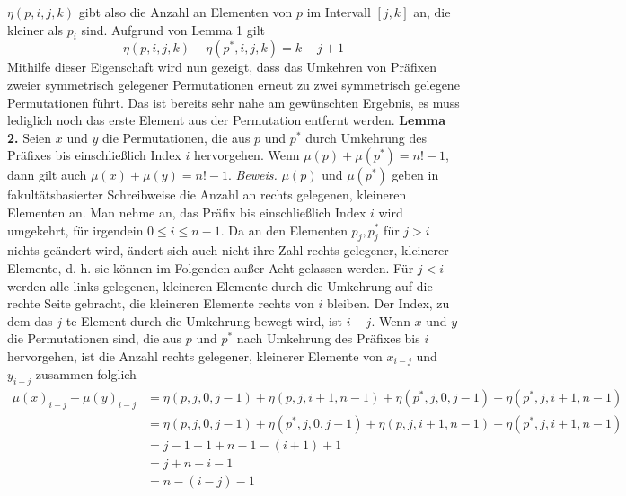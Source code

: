 \documentclass[a4paper, 11pt, ngerman]{article}
\begin{document}
$\eta(p, i, j, k)$ gibt also die Anzahl an Elementen von $p$ im Intervall $[j, k]$ an, die kleiner als $p_i$ sind. Aufgrund von Lemma 1 gilt
$$
    \eta(p, i, j, k) + \eta(p^*, i, j, k) = k - j + 1
$$
Mithilfe dieser Eigenschaft wird nun gezeigt, dass das Umkehren von Präfixen zweier symmetrisch gelegener Permutationen erneut zu zwei symmetrisch gelegene Permutationen führt. Das ist bereits sehr nahe am gewünschten Ergebnis, es muss lediglich noch das erste Element aus der Permutation entfernt werden.
\newline \newline
\textbf{Lemma 2.} Seien $x$ und $y$ die Permutationen, die aus $p$ und $p^*$ durch Umkehrung des Präfixes bis einschließlich Index $i$ hervorgehen. Wenn $\mu(p) + \mu(p^*) = n! - 1$, dann gilt auch $\mu(x) + \mu(y) = n! - 1$.
\newline \newline
\emph{Beweis.} $\mu(p)$ und $\mu(p^*)$ geben in fakultätsbasierter Schreibweise die Anzahl an rechts gelegenen, kleineren Elementen an. Man nehme an, das Präfix bis einschließlich Index $i$ wird umgekehrt, für irgendein $0 \le i \le n-1$. Da an den Elementen $p_j, p^*_j$ für $j > i$ nichts geändert wird, ändert sich auch nicht ihre Zahl rechts gelegener, kleinerer Elemente, d. h. sie können im Folgenden außer Acht gelassen werden. Für $j < i$ werden alle links gelegenen, kleineren Elemente durch die Umkehrung auf die rechte Seite gebracht, die kleineren Elemente rechts von $i$ bleiben. Der Index, zu dem das $j$-te Element durch die Umkehrung bewegt wird, ist $i - j$. Wenn $x$ und $y$ die Permutationen sind, die aus $p$ und $p^*$ nach Umkehrung des Präfixes bis $i$ hervorgehen, ist die Anzahl rechts gelegener, kleinerer Elemente von $x_{i - j}$ und $y_{i - j}$ zusammen folglich
\begin{align*}
    \mu(x)_{i - j} + \mu(y)_{i - j}
     & = \eta(p, j, 0, j - 1) + \eta(p, j, i + 1, n - 1) + \eta(p^*, j, 0, j - 1) + \eta(p^*, j, i + 1, n - 1) \\
     & = \eta(p, j, 0, j - 1) + \eta(p^*, j, 0, j - 1) + \eta(p, j, i + 1, n - 1) + \eta(p^*, j, i + 1, n - 1) \\
     & = j - 1 + 1 + n - 1 - (i + 1) + 1                                                                       \\
     & = j + n - i - 1                                                                                         \\
     & = n - (i - j) - 1
\end{align*}
\end{document}
